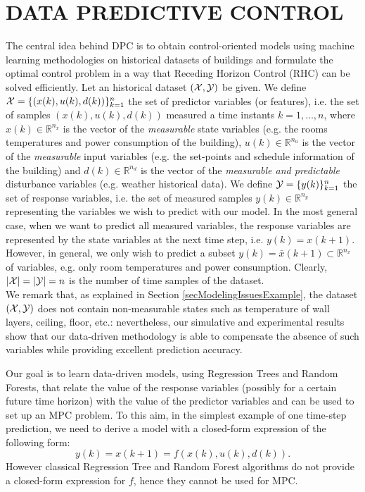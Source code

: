 \section{DATA PREDICTIVE CONTROL}

\label{S:dpc}



\textcolor[rgb]{0,0,1}{The central idea behind DPC is to obtain control-oriented models using machine learning methodologies on historical datasets of buildings and formulate the optimal control problem in a way that Receding Horizon Control (RHC) can be solved efficiently. Let an historical dataset $(\mathcal{X},\mathcal{Y})$ be given.
We define $\mathcal{X} = \{(x(k),u(k),d(k))\}_{k=1}^n$ the set of predictor variables (or features), i.e. the set of samples $(x(k),u(k),d(k))$ measured a time instants $k=1,\ldots,n$, where $x(k)\in\mathbb{R}^{n_x}$ is the vector of the \emph{measurable} state variables (e.g. the rooms temperatures and power consumption of the building), $u(k)\in\mathbb{R}^{n_u}$ is the vector of the \emph{measurable} input variables (e.g. the set-points and schedule information of the building) and $d(k)\in\mathbb{R}^{n_d}$ is the vector of the \emph{measurable and predictable} disturbance variables (e.g. weather historical data).
We define $\mathcal{Y} = \{y(k)\}_{k=1}^{n}$ the set of response variables, i.e. the set of measured samples $y(k)\in\mathbb{R}^{n_y}$ representing the variables we wish to predict with our model. In the most general case, when we want to predict all measured variables, the response variables are represented by the state variables at the next time step, i.e. $y(k) = x(k+1)$. However, in general, we only wish to predict a subset $y(k) = \bar x(k+1) \subset \mathbb{R}^{n_x}$ of variables, e.g. only room temperatures and power consumption.
Clearly, $|\mathcal{X}| = |\mathcal{Y}| = n$ is the number of time samples of the dataset.\\
We remark that, as explained in Section \ref{secModelingIssuesExample}, the dataset $(\mathcal{X},\mathcal{Y})$ does not contain non-measurable states such as temperature of wall layers, ceiling, floor, etc.: nevertheless, our simulative and experimental results show that our data-driven methodology is able to compensate the absence of such variables while providing excellent prediction accuracy.}



\textcolor[rgb]{0,0,1}{Our goal is to learn data-driven models, using Regression Trees and Random Forests, that relate the value of the response variables (possibly for a certain future time horizon) with the value of the predictor variables and can be used to set up an MPC problem. To this aim, in the simplest example of one time-step prediction, we need to derive a model with a closed-form expression of the following form:
\begin{equation}\label{E:GenericModel}
	y(k)=x(k+1)=f(x(k),u(k),d(k)).
\end{equation}
However classical Regression Tree and Random Forest algorithms do not provide a closed-form expression for $f$, hence they cannot be used for MPC.}


